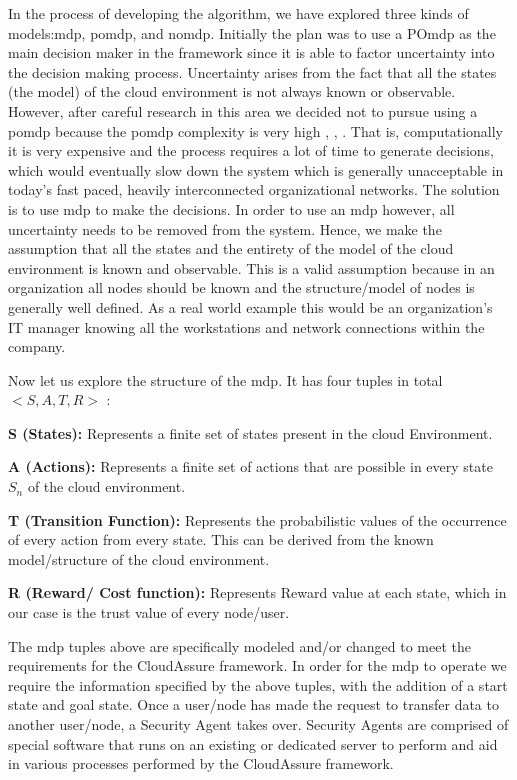 In the process of
developing the algorithm, we have explored three kinds of models:\gls{mdp},
\gls{pomdp}, and \gls{nomdp}. Initially the plan was to use a PO\gls{mdp} as the 
main decision maker in the
framework since it is able to factor uncertainty into the decision making process.
Uncertainty arises from the fact that all the states (the model) of the cloud
environment is not always known or observable. However, after careful research
in this area we decided not to pursue using a \gls{pomdp} because the
\gls{pomdp} complexity
is very high \autocite{LeslieP.Kaelbling1998}, \autocite{Zilberman},
\autocite{DongNguyen2009}. 
That is, computationally it is very expensive and the
process requires a lot of time to generate decisions, which would eventually
slow down the system which is generally unacceptable in today's fast paced, heavily interconnected organizational networks.
The solution is to use \gls{mdp} to make the decisions. In order
to use an \gls{mdp} however, all uncertainty needs to be removed from the system.
Hence, we make the assumption that all the states and the entirety of the model of
the cloud environment is known and observable. This is a valid assumption
because in an organization all nodes should be known and the structure/model of nodes
is generally well defined. As a real world example this would be an organization's IT
manager knowing all the workstations and network connections within the company.

Now let us explore the structure of the \gls{mdp}. It
has four tuples in total $< S, A, T, R >$ \autocite{QimingHe2000}:
\begin{description}
    \item{\textbf{S (States):}} Represents a finite set of states present in the cloud Environment.
    \item{\textbf{A (Actions):}} Represents a finite set of actions that are possible in
        every state $S_n$ of the cloud environment.
    \item{\textbf{T (Transition Function):}} Represents the probabilistic values of the occurrence of every action from every state. This can be derived from the known model/structure of the cloud environment.
    \item{\textbf{R (Reward/ Cost function):}} Represents Reward value at each state, which
    in our case is the trust value of every node/user.  
\end{description}
The \gls{mdp} tuples above are
specifically modeled and/or changed to meet the requirements for the CloudAssure framework. In order for the \gls{mdp} to operate we require the
information specified by the above tuples, with the addition of a start
state and goal state. Once a user/node has made the request to transfer data
to another user/node, a Security Agent takes over. Security Agents are comprised of special software that runs on an existing or dedicated server to perform and aid in various processes performed by the CloudAssure framework.

